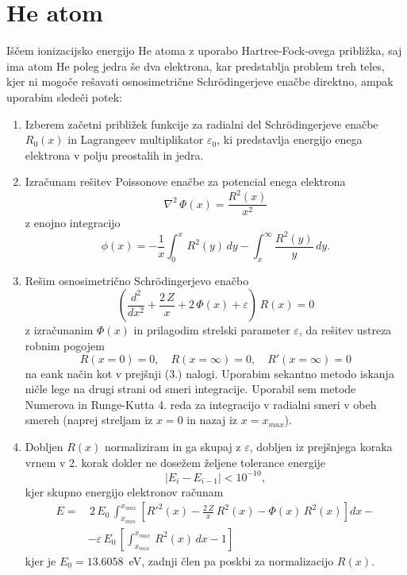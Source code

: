 \graphicspath{{4.nal_slike/}}

\section{He atom}

Iščem ionizacijsko energijo He atoma z uporabo Hartree-Fock-ovega približka, saj ima atom He poleg jedra še dva elektrona, kar predstablja problem treh teles, kjer ni mogoče rešavati osnosimetrične Schr{\"o}dingerjeve enačbe direktno, ampak uporabim sledeči potek:
\begin{enumerate}
    \item Izberem začetni približek funkcije za radialni del Schr{\"o}dingerjeve enačbe $R_0(x)$ in Lagrangeev multiplikator $\varepsilon_0$, ki predstavlja energijo enega elektrona v polju preostalih in jedra.
    \item Izračunam rešitev Poissonove enačbe za potencial enega elektrona
    \begin{equation}
        \nabla^2\,\Phi(x) = \frac{R^2(x)}{x^2}
    \end{equation}
    z enojno integracijo
    \begin{equation}
        \phi(x) = -\frac{1}{x} \int_{0}^{x}\,R^2(y)\,dy - \int_{x}^{\infty}\frac{R^2(y)}{y}\,dy.
     \end{equation}
     \item Rešim osnosimetrično Schr{\"o}dingerjevo enačbo
     \begin{equation}
        \left( \frac{d^2}{dx^2} + \frac{2\,Z}{x} + 2\,\Phi(x) + \varepsilon \right) \, R(x) = 0
     \end{equation}
     z izračunanim $\Phi(x)$ in prilagodim strelski parameter $\varepsilon$, da rešitev ustreza robnim pogojem
     \begin{equation}
        R(x=0)=0,\quad R(x=\infty)=0, \quad R'(x=\infty)=0
     \end{equation}
     na eank način kot v prejšnji (3.) nalogi. Uporabim sekantno metodo iskanja ničle lege na drugi strani od smeri integracije. Uporabil sem metode Numerova in Runge-Kutta 4. reda za integracijo v radialni smeri v obeh smereh (naprej streljam iz $x=0$ in nazaj iz $x=x_{max}$).
     \item Dobljen $R(x)$ normaliziram in ga skupaj z $\varepsilon$, dobljen iz prejšnjega koraka vrnem v 2. korak dokler ne dosežem željene tolerance energije
     \begin{equation}
        |E_i-E_{i-1}| < 10^{-10},
     \end{equation}
     kjer skupno energijo elektronov računam
     \begin{align}
        E = & \, 2\,E_0\,\int_{x_{min}}^{x_{max}} \left[ R'^2(x) - \frac{2\,Z}{x}\,R^2(x) - \Phi(x)\,R^2(x) \right] dx - \nonumber \\
        & - \varepsilon\,E_0\, \left[ \int_{x_{min}}^{x_{max}}\,R^2(x)\,dx -1 \right]
    \end{align}
     kjer je $E_0=13.6058$~eV, zadnji člen pa poskbi za normalizacijo $R(x)$.
\end{enumerate}

